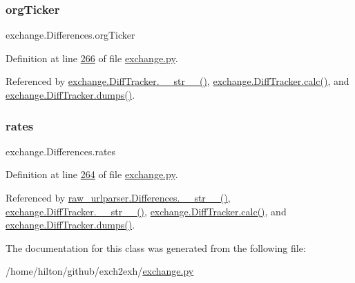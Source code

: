 \mbox{\label{classexchange_1_1_differences_a25b2d5907724e4647425ab4089ce065e}} 
\subsubsection{\texorpdfstring{org\+Ticker}{orgTicker}}
{\footnotesize\ttfamily exchange.\+Differences.\+org\+Ticker}



Definition at line \hyperlink{exchange_8py_source_l00266}{266} of file \hyperlink{exchange_8py_source}{exchange.\+py}.



Referenced by \hyperlink{exchange_8py_source_l00336}{exchange.\+Diff\+Tracker.\+\_\+\+\_\+str\+\_\+\+\_\+()}, \hyperlink{exchange_8py_source_l00309}{exchange.\+Diff\+Tracker.\+calc()}, and \hyperlink{exchange_8py_source_l00385}{exchange.\+Diff\+Tracker.\+dumps()}.

\mbox{\label{classexchange_1_1_differences_a821ecbc04dae3081f634a28d377c69c3}} 
\subsubsection{\texorpdfstring{rates}{rates}}
{\footnotesize\ttfamily exchange.\+Differences.\+rates}



Definition at line \hyperlink{exchange_8py_source_l00264}{264} of file \hyperlink{exchange_8py_source}{exchange.\+py}.



Referenced by \hyperlink{raw__urlparser_8py_source_l00100}{raw\+\_\+urlparser.\+Differences.\+\_\+\+\_\+str\+\_\+\+\_\+()}, \hyperlink{exchange_8py_source_l00336}{exchange.\+Diff\+Tracker.\+\_\+\+\_\+str\+\_\+\+\_\+()}, \hyperlink{exchange_8py_source_l00309}{exchange.\+Diff\+Tracker.\+calc()}, and \hyperlink{exchange_8py_source_l00385}{exchange.\+Diff\+Tracker.\+dumps()}.



The documentation for this class was generated from the following file\+:\begin{DoxyCompactItemize}
\item 
/home/hilton/github/exch2exh/\hyperlink{exchange_8py}{exchange.\+py}\end{DoxyCompactItemize}
